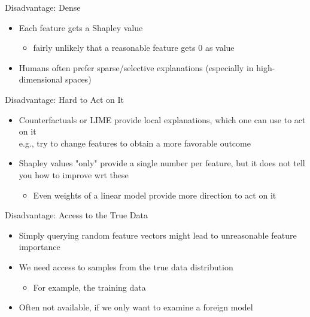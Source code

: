 \documentclass[aspectratio=169]{../latex_main/tntbeamer}  %
\begin{document}
\begin{frame}{Disadvantage: Dense}
    
    \begin{itemize}
        \item Each feature gets a Shapley value
        \begin{itemize}
            \item fairly unlikely that a reasonable feature gets $0$ as value
        \end{itemize}
        \item Humans often prefer sparse/selective explanations (especially in high-dimensional spaces)
    \end{itemize}
    
\end{frame}

\begin{frame}{Disadvantage: Hard to Act on It}
    
    \begin{itemize}
        \item Counterfactuals or LIME provide local explanations, which one can use to act on it\\ e.g., try to change features to obtain a more favorable outcome
        \item Shapley values "only" provide a single number per feature, but it does not tell you how to improve wrt these
        \begin{itemize}
            \item Even weights of a linear model provide more direction to act on it
        \end{itemize}
        
    \end{itemize}
    
\end{frame}

\begin{frame}{Disadvantage: Access to the True Data}
    
    \begin{itemize}
        \item Simply querying random feature vectors might lead to unreasonable feature importance
        \item We need access to samples from the true data distribution
        \begin{itemize}
            \item For example, the training data
        \end{itemize}
        \item Often not available, if we only want to examine a foreign model
    \end{itemize}
    
\end{frame}
\end{document}
